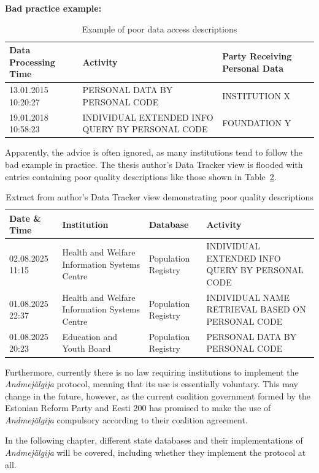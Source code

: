 \textbf{Bad practice example:}

\begin{table}[H]
\centering
\begin{tabular}{|p{3cm}|p{6cm}|p{4cm}|}
\hline
\textbf{Data Processing Time} & \textbf{Activity} & \textbf{Party Receiving Personal Data} \\
\hline
13.01.2015 10:20:27 & PERSONAL DATA BY PERSONAL CODE & INSTITUTION X \\
\hline
19.01.2018 10:58:23 & INDIVIDUAL EXTENDED INFO QUERY BY PERSONAL CODE & FOUNDATION Y \\
\hline
\end{tabular}
\caption{Example of poor data access descriptions\cite{ria-andmejalgija-recommendations}}
\label{tab:example-bad}
\end{table}

Apparently, the advice is often ignored, as many institutions tend to follow the bad example in practice. The thesis author's Data Tracker view is flooded with entries containing poor quality descriptions like those shown in Table~\ref{tab:author-data-tracker}.

\begin{table}[H]
\centering
\begin{tabular}{|p{2.5cm}|p{5cm}|p{3cm}|p{3.5cm}|}
\hline
\textbf{Date \& Time} & \textbf{Institution} & \textbf{Database} & \textbf{Activity} \\
\hline
02.08.2025 11:15 & Health and Welfare Information Systems Centre & Population Registry & INDIVIDUAL EXTENDED INFO QUERY BY PERSONAL CODE \\
\hline
01.08.2025 22:37 & Health and Welfare Information Systems Centre & Population Registry & INDIVIDUAL NAME RETRIEVAL BASED ON PERSONAL CODE \\
\hline
01.08.2025 20:23 & Education and Youth Board & Population Registry & PERSONAL DATA BY PERSONAL CODE \\
\hline
\end{tabular}
\caption{Extract from author's Data Tracker view demonstrating poor quality descriptions}
\label{tab:author-data-tracker}
\end{table}

Furthermore, currently there is no law requiring institutions to implement the \textit{Andmejälgija} protocol, meaning that its use is essentially voluntary. This may change in the future, however, as the current coalition government formed by the Estonian Reform Party and Eesti 200 has promised to make the use of \textit{Andmejälgija} compulsory according to their coalition agreement\cite{coalition-agreement-2025-2027}.

In the following chapter, different state databases and their implementations of \textit{Andmejälgija} will be covered, including whether they implement the protocol at all.